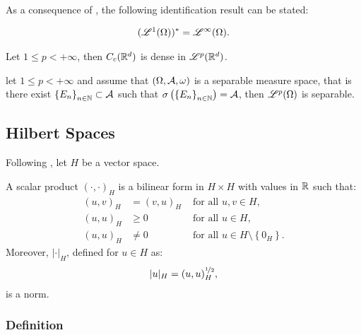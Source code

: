 As a consequence of , the following identification result can be stated:

\begin{theorem}
    \begin{align}
        (\mathscr{L}^{1}(\Omega))^* = \mathscr{L}^{\infty}(\Omega).
    \end{align}
\end{theorem}

\begin{theorem}
    Let $1 \leq p < +\infty$, then $C_c(\mathbb{R}^{d})$ is dense in $\mathscr{L}^{p}(\mathbb{R}^{d})$.
\end{theorem}

\begin{theorem}
    let $1 \leq p < +\infty$ and assume that $(\Omega, \mathcal{A}, \omega)$ is a separable measure space, that is there exist $\left\{ E_n \right\}_{n \in \mathbb{N}} \subset \mathcal{A}$ such that $\sigma \left( \left\{ E_n \right\}_{n \in \mathbb{N}} \right) = \mathcal{A}$, then $\mathscr{L}^{p}(\Omega)$ is separable.
\end{theorem}

\newpage
\subsection{Hilbert Spaces} \label{subsection:hilbert}

Following \cite[p.~131]{Brezis2010}, let $H$ be a vector space.

\begin{definition}
    A scalar product $\left( \cdot, \cdot \right)_H$ is a bilinear form in $H \times H$ with values in $\mathbb{R}$ such that:
    \begin{align}
        (u, v)_H & = (v, u)_H &\text{ for all } u, v \in H, \\
        (u, u)_H & \geq 0 &\text{ for all } u \in H, \\
        (u, u)_H & \neq 0 &\text{ for all } u \in H \setminus \left\{ 0_H \right\}.
    \end{align}
    Moreover, $\lvert \cdot \rvert_H$, defined for $u \in H$ as:
    \begin{align} %
        \lvert u \rvert_H = (u, u)_H^{\nicefrac12},
    \end{align}
    is a norm.
\end{definition}

\subsubsection{Definition}

